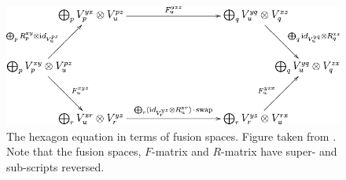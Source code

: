 \begin{figure}[!htb]
  \centering
  \includegraphics[width=1\linewidth]{img/hexagon_space.pdf}
  \caption{The hexagon equation in terms of fusion spaces. Figure taken from \cite{kitaev}. Note that the fusion spaces, $F$-matrix and $R$-matrix have super- and sub-scripts reversed.}
  \label{fig:hexagon_space}
\end{figure}


\clearpage


